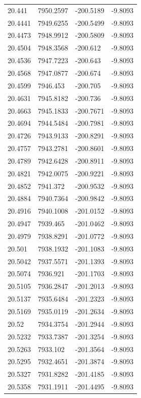\begin{table}[H]
\begin{tabular}{llll}
20.441 & 7950.2597 & -200.5189 & -9.8093 \\
20.4441 & 7949.6255 & -200.5499 & -9.8093 \\
20.4473 & 7948.9912 & -200.5809 & -9.8093 \\
20.4504 & 7948.3568 & -200.612 & -9.8093 \\
20.4536 & 7947.7223 & -200.643 & -9.8093 \\
20.4568 & 7947.0877 & -200.674 & -9.8093 \\
20.4599 & 7946.453 & -200.705 & -9.8093 \\
20.4631 & 7945.8182 & -200.736 & -9.8093 \\
20.4663 & 7945.1833 & -200.7671 & -9.8093 \\
20.4694 & 7944.5484 & -200.7981 & -9.8093 \\
20.4726 & 7943.9133 & -200.8291 & -9.8093 \\
20.4757 & 7943.2781 & -200.8601 & -9.8093 \\
20.4789 & 7942.6428 & -200.8911 & -9.8093 \\
20.4821 & 7942.0075 & -200.9221 & -9.8093 \\
20.4852 & 7941.372 & -200.9532 & -9.8093 \\
20.4884 & 7940.7364 & -200.9842 & -9.8093 \\
20.4916 & 7940.1008 & -201.0152 & -9.8093 \\
20.4947 & 7939.465 & -201.0462 & -9.8093 \\
20.4979 & 7938.8291 & -201.0772 & -9.8093 \\
20.501 & 7938.1932 & -201.1083 & -9.8093 \\
20.5042 & 7937.5571 & -201.1393 & -9.8093 \\
20.5074 & 7936.921 & -201.1703 & -9.8093 \\
20.5105 & 7936.2847 & -201.2013 & -9.8093 \\
20.5137 & 7935.6484 & -201.2323 & -9.8093 \\
20.5169 & 7935.0119 & -201.2634 & -9.8093 \\
20.52 & 7934.3754 & -201.2944 & -9.8093 \\
20.5232 & 7933.7387 & -201.3254 & -9.8093 \\
20.5263 & 7933.102 & -201.3564 & -9.8093 \\
20.5295 & 7932.4651 & -201.3874 & -9.8093 \\
20.5327 & 7931.8282 & -201.4185 & -9.8093 \\
20.5358 & 7931.1911 & -201.4495 & -9.8093 \\

\end{tabular}
\end{table}
